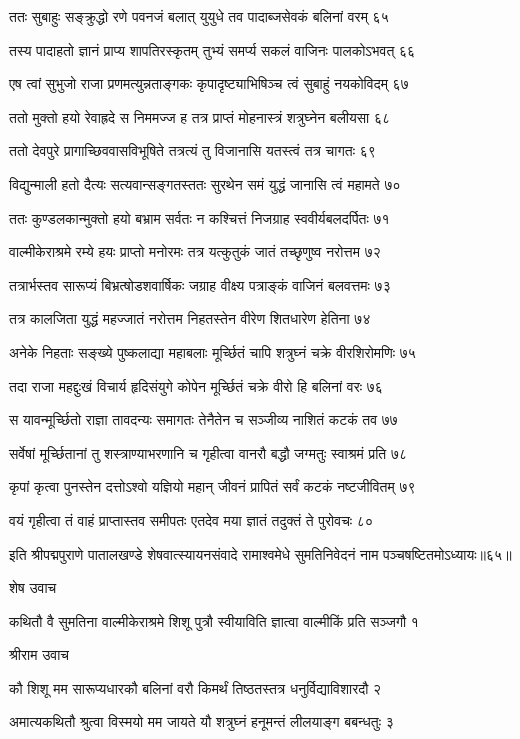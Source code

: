 ततः सुबाहुः सङ्क्रुद्धो रणे पवनजं बलात्
युयुधे तव पादाब्जसेवकं बलिनां वरम् ६५

तस्य पादाहतो ज्ञानं प्राप्य शापतिरस्कृतम्
तुभ्यं समर्प्य सकलं वाजिनः पालकोऽभवत् ६६

एष त्वां सुभुजो राजा प्रणमत्युन्नताङ्गकः
कृपादृष्ट्याभिषिञ्च त्वं सुबाहुं नयकोविदम् ६७

ततो मुक्तो हयो रेवाह्रदे स निममज्ज ह
तत्र प्राप्तं मोहनास्त्रं शत्रुघ्नेन बलीयसा ६८

ततो देवपुरे प्रागाच्छिववासविभूषिते
तत्रत्यं तु विजानासि यतस्त्वं तत्र चागतः ६९

विद्युन्माली हतो दैत्यः सत्यवान्सङ्गतस्ततः
सुरथेन समं युद्धं जानासि त्वं महामते ७०

ततः कुण्डलकान्मुक्तो हयो बभ्राम सर्वतः
न कश्चित्तं निजग्राह स्ववीर्यबलदर्पितः ७१

वाल्मीकेराश्रमे रम्ये हयः प्राप्तो मनोरमः
तत्र यत्कुतुकं जातं तच्छृणुष्व नरोत्तम ७२

तत्रार्भस्तव सारूप्यं बिभ्रत्षोडशवार्षिकः
जग्राह वीक्ष्य पत्राङ्कं वाजिनं बलवत्तमः ७३

तत्र कालजिता युद्धं महज्जातं नरोत्तम
निहतस्तेन वीरेण शितधारेण हेतिना ७४

अनेके निहताः सङ्ख्ये पुष्कलाद्या महाबलाः
मूर्च्छितं चापि शत्रुघ्नं चक्रे वीरशिरोमणिः ७५

तदा राजा महद्दुःखं विचार्य हृदिसंयुगे
कोपेन मूर्च्छितं चक्रे वीरो हि बलिनां वरः ७६

स यावन्मूर्च्छितो राज्ञा तावदन्यः समागतः
तेनैतेन च सञ्जीव्य नाशितं कटकं तव ७७

सर्वेषां मूर्च्छितानां तु शस्त्राण्याभरणानि च
गृहीत्वा वानरौ बद्धौ जग्मतुः स्वाश्रमं प्रति ७८

कृपां कृत्वा पुनस्तेन दत्तोऽश्वो यज्ञियो महान्
जीवनं प्रापितं सर्वं कटकं नष्टजीवितम् ७९

वयं गृहीत्वा तं वाहं प्राप्तास्तव समीपतः
एतदेव मया ज्ञातं तदुक्तं ते पुरोवचः ८०

इति श्रीपद्मपुराणे पातालखण्डे शेषवात्स्यायनसंवादे रामाश्वमेधे सुमतिनिवेदनं नाम पञ्चषष्टितमोऽध्यायः॥६५॥


शेष उवाच

कथितौ वै सुमतिना वाल्मीकेराश्रमे शिशू
पुत्रौ स्वीयाविति ज्ञात्वा वाल्मीकिं प्रति सञ्जगौ १

श्रीराम उवाच

कौ शिशू मम सारूप्यधारकौ बलिनां वरौ
किमर्थं तिष्ठतस्तत्र धनुर्विद्याविशारदौ २

अमात्यकथितौ श्रुत्वा विस्मयो मम जायते
यौ शत्रुघ्नं हनूमन्तं लीलयाङ्ग बबन्धतुः ३

